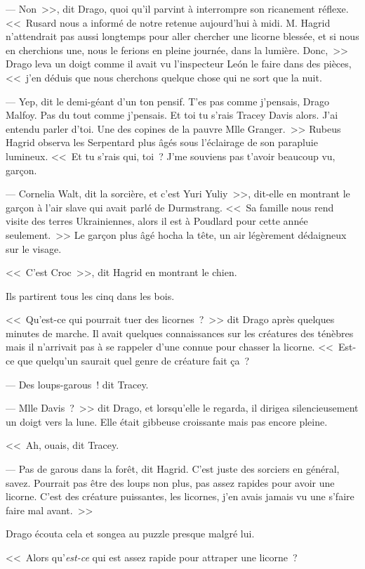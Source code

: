 --- Non~>>, dit Drago, quoi qu'il parvint à interrompre son ricanement réflexe. <<~Rusard nous a informé de notre retenue aujourd'hui à midi. M. Hagrid n'attendrait pas aussi longtemps pour aller chercher une licorne blessée, et si nous en cherchions une, nous le ferions en pleine journée, dans la lumière. Donc,~>> Drago leva un doigt comme il avait vu l'inspecteur León le faire dans des pièces, <<~j'en déduis que nous cherchons quelque chose qui ne sort que la nuit.

--- Yep, dit le demi-géant d'un ton pensif. T'es pas comme j'pensais, Drago Malfoy. Pas du tout comme j'pensais. Et toi tu s'rais Tracey Davis alors. J'ai entendu parler d'toi. Une des copines de la pauvre Mlle Granger.~>> Rubeus Hagrid observa les Serpentard plus âgés sous l'éclairage de son parapluie lumineux. <<~Et tu s'rais qui, toi~? J'me souviens pas t'avoir beaucoup vu, garçon.

--- Cornelia Walt, dit la sorcière, et c'est Yuri Yuliy~>>, dit-elle en montrant le garçon à l'air slave qui avait parlé de Durmstrang. <<~Sa famille nous rend visite des terres Ukrainiennes, alors il est à Poudlard pour cette année seulement.~>> Le garçon plus âgé hocha la tête, un air légèrement dédaigneux sur le visage.

<<~C'est Croc~>>, dit Hagrid en montrant le chien.

Ils partirent tous les cinq dans les bois.

<<~Qu'est-ce qui pourrait tuer des licornes~?~>> dit Drago après quelques minutes de marche. Il avait quelques connaissances sur les créatures des ténèbres mais il n'arrivait pas à se rappeler d'une connue pour chasser la licorne. <<~Est-ce que quelqu'un saurait quel genre de créature fait ça~?

--- Des loups-garous~! dit Tracey.

--- Mlle Davis~?~>> dit Drago, et lorsqu'elle le regarda, il dirigea silencieusement un doigt vers la lune. Elle était gibbeuse croissante mais pas encore pleine.

<<~Ah, ouais, dit Tracey.

--- Pas de garous dans la forêt, dit Hagrid. C'est juste des sorciers en général, savez. Pourrait pas être des loups non plus, pas assez rapides pour avoir une licorne. C'est des créature puissantes, les licornes, j'en avais jamais vu une s'faire faire mal avant.~>>

Drago écouta cela et songea au puzzle presque malgré lui.

<<~Alors qu'\emph{est-ce} qui est assez rapide pour attraper une licorne~?

